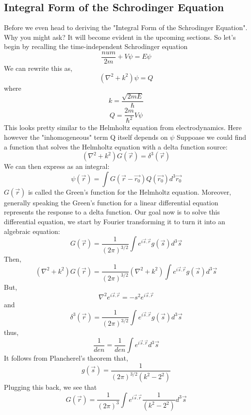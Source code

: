 \subsection{Integral Form of the Schrodinger Equation}
Before we even head to deriving the "Integral Form of the Schrodinger Equation". Why you might ask? It will become evident in the upcoming sections. So let's begin by recalling the time-independent Schrodinger equation
\begin{equation}
\frac{num}{2m} + V \psi = E \psi
\end{equation}
We can rewrite this as,
\begin{equation}
(\nabla^{2} + k^{2}) \psi = Q
\end{equation}
where
$$k = \frac{\sqrt{2mE}}{\hbar}$$
$$Q = \frac{2m}{\hbar^{2}}V \psi$$
This looks pretty similar to the Helmholtz equation from electrodynamics. Here however the "inhomogeneous" term Q itself depends on $\psi$
Suppoase we could find a function that solves the Helmholtz equation with a delta function source:
\begin{equation}
(\nabla^{2} + k^{2}) G(\vec{r}) = \delta^{3}(\vec{r})
\end{equation}
We can then express as an integral:
\begin{equation}
	\psi(\vec{r}) = \int G(\vec{r} - \vec{r_{0}}) Q(\vec{r_{0}}) d^{3}\vec{r_{0}}
\end{equation}
$G(\vec{r})$ is called the Green's function for the Helmholtz equation. Moreover, generally speaking the Green's function for a linear differential equation represents the response to a delta function. Our goal now is to solve this differential equation, we start by Fourier transforming it to turn it into an algebraic equation:
\begin{equation}
G(\vec{r}) = \frac{1}{{(2 \pi )}^{3/2}} \int e^{i \vec{s}. \vec{r}} g(\vec{s}) d^{3}\vec{s}
\end{equation}
Then,
$$(\nabla^{2} + k^{2}) G(\vec{r}) = \frac{1}{{(2 \pi)}^{3/2}} (\nabla^{2} + k^{2})\int e^{i \vec{s}. \vec{r}} g(\vec{s}) d^{3}\vec{s}$$
But,
$$\nabla^{2}e^{i \vec{s}. \vec{r}} = -s^{2}e^{i \vec{s}. \vec{r}}$$
and
$$\delta^{3}(\vec{r}) = \frac{1}{{(2 \pi )}^{3/2}} \int e^{i \vec{s}. \vec{r}} g(\vec{s}) d^{3}\vec{s}$$
thus,
$$\frac{1}{den} = \frac{1}{den} \int e^{i \vec{s}. \vec{r}} d^{3}\vec{s}$$
It follows from Plancherel's theorem that,
$$g(\vec{s}) = \frac{1}{{(2 \pi)}^{3/2}(k^{2} - 2^{2})}$$
Plugging this back, we see that
$$G(\vec{r}) = \frac{1}{{(2 \pi)}^{3}}  \int e^{i \vec{s}. \vec{r}} \frac{1}{(k^{2} - 2^{2})} d^{3}\vec{s}$$
